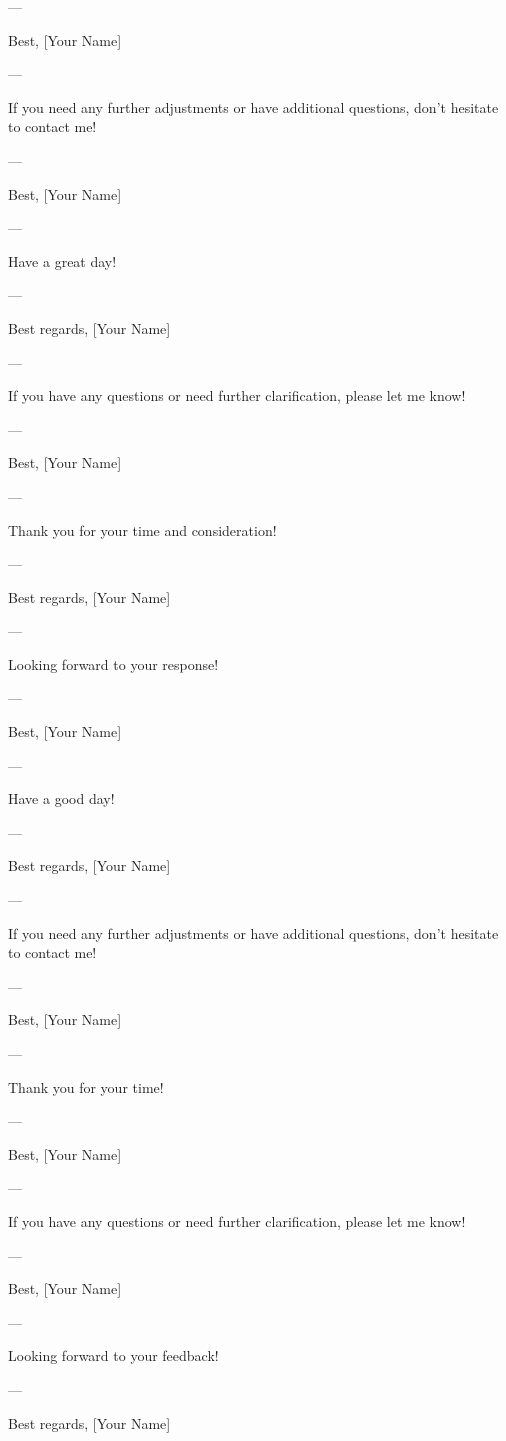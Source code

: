 --- 

Best,  
[Your Name]  

--- 

If you need any further adjustments or have additional questions, don't hesitate to contact me! 

--- 

Best,  
[Your Name]  

--- 

Have a great day! 

--- 

Best regards,  
[Your Name]  

--- 

If you have any questions or need further clarification, please let me know! 

--- 

Best,  
[Your Name]  

--- 

Thank you for your time and consideration! 

--- 

Best regards,  
[Your Name]  

--- 

Looking forward to your response! 

--- 

Best,  
[Your Name]  

--- 

Have a good day! 

--- 

Best regards,  
[Your Name]  

--- 

If you need any further adjustments or have additional questions, don't hesitate to contact me! 

--- 

Best,  
[Your Name]  

--- 

Thank you for your time! 

--- 

Best,  
[Your Name]  

--- 

If you have any questions or need further clarification, please let me know! 

--- 

Best,  
[Your Name]  

--- 

Looking forward to your feedback! 

--- 

Best regards,  
[Your Name]  

